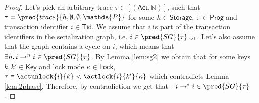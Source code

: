 \begin{proof}
Let's pick an arbitrary trace $\tau \in [(\mathsf{Act}, \mathds{N})]$, such that $\tau = \pred{trace}{h, \emptyset, \emptyset, \mathds{P}}$ for some $h \in \mathsf{Storage}$, $\mathds{P} \in \mathsf{Prog}$ and transaction identifier $i \in \mathsf{Tid}$. We assume that $i$ is part of the transaction identifiers in the serialization graph, i.e. $i \in \pred{SG}{\tau} \downarrow_1$. Let's also assume that the graph contains a cycle on $i$, which means that $\exists n \ldotp i \rightarrow^n i \in \pred{SG}{\tau}$. By Lemma \ref{lem:sg2} we obtain that for some keys $k, k' \in \mathsf{Key}$ and lock mode $\kappa \in \mathsf{Lock}$, $\tau \vDash \actunlock{i}{k} < \actlock{i}{k'}{\kappa}$ which contradicts Lemma \ref{lem:2phase}. Therefore, by contradiction we get that $\lnot i \rightarrow^* i \in \pred{SG}{\tau}$.
\end{proof}